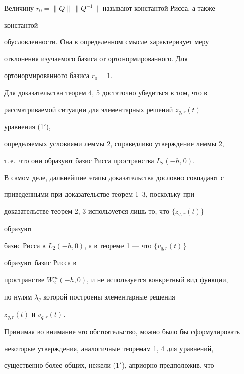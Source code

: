  


\begin{note} 


Величину $r_0=\|Q\|\,\|Q^{-1}\|$ называют константой Рисса, а также 


константой 


обусловленности. Она в определенном смысле характеризует меру 


отклонения изучаемого базиса от ортонормированного. Для 


ортонормированного базиса $r_0=1$. 


\end{note} 


 


 


Для доказательства теорем 4, 5 достаточно убедиться в том, что в 


рассматриваемой ситуации для элементарных решений $z_{q,r}(t)$ 


уравнения (1$'$), 


определяемых условиями леммы 2, справедливо утверждение леммы 2, 


т.\,е.~что они образуют базис Рисса пространства $L_2(-h,0)$. 


 


В самом деле, дальнейшие этапы доказательства дословно совпадают с 


приведенными при доказательстве теорем 1--3, поскольку при 


доказательстве теорем 2, 3 используется лишь то, что $\{z_{q,r}(t)\}$ 


образуют 


базис Рисса в $L_2(-h,0)$, а в теореме 1 --- что $\{v_{q,r}(t)\}$ 


образуют базис Рисса в 


пространстве $W^m_2(-h,0)$, и не используется конкретный вид функции,


по нулям $\lambda_q$ которой построены элементарные решения 


$z_{q,r}(t)$ и $v_{q,r}(t)$. 


 


Принимая во внимание это обстоятельство, можно было бы сформулировать 


некоторые утверждения, аналогичные теоремам 1, 4 для уравнений, 


существенно более общих, нежели (1$'$), априорно предположив, что 


